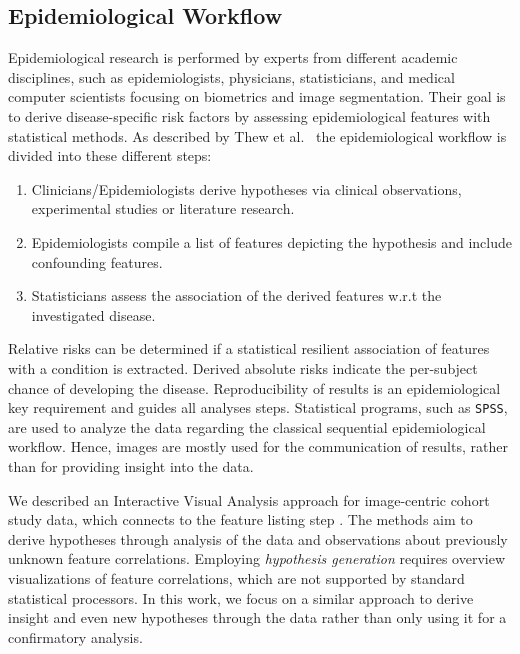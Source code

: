 \documentclass[journal]{style/vgtc} 			          %
\begin{document}
\subsection{Epidemiological Workflow} \label{sec:EpidemiologicalWorkflow}
Epidemiological research is performed by experts from different academic disciplines, such as epidemiologists, physicians, statisticians, and medical computer scientists focusing on biometrics and image segmentation.
Their goal is to derive disease-specific risk factors by assessing epidemiological features with statistical methods.
As described by Thew et al.~\cite{Thew2009} the epidemiological workflow is divided into these different steps:
\begin{enumerate}
	\item Clinicians/Epidemiologists derive hypotheses via clinical observations, experimental studies or literature research.
	\item Epidemiologists compile a list of features depicting the hypothesis and include confounding features.
	\item Statisticians assess the association of the derived features w.r.t the investigated disease.
\end{enumerate}
Relative risks can be determined if a statistical resilient association of features with a condition is extracted.
Derived absolute risks indicate the per-subject chance of developing the disease.
Reproducibility of results is an epidemiological key requirement and guides all analyses steps.
Statistical programs, such as \texttt{SPSS}, are used to analyze the data regarding the classical sequential epidemiological workflow.
Hence, images are mostly used for the communication of results, rather than for providing insight into the data.

We described an Interactive Visual Analysis approach for image-centric cohort study data, which connects to the feature listing step \cite{Klemm2014VIS}.
The methods aim to derive hypotheses through analysis of the data and observations about previously unknown feature correlations.
Employing \emph{hypothesis generation} requires overview visualizations of feature correlations, which are not supported by standard statistical processors.
In this work, we focus on a similar approach to derive insight and even new hypotheses through the data rather than only using it for a confirmatory analysis.
\end{document}

